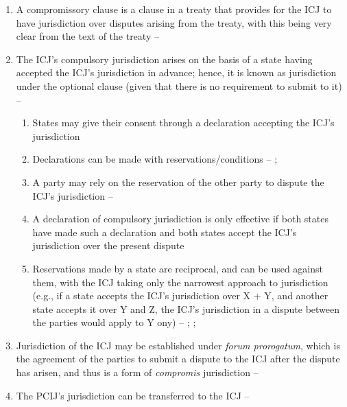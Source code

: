 \begin{enumerate}
\begin{enumerate}
\begin{enumerate}
            \item A compromissory clause is a clause in a treaty that provides for the ICJ to have jurisdiction over disputes arising from the treaty, with this being very clear from the text of the treaty -- 
            \item The ICJ's compulsory jurisdiction arises on the basis of a state having accepted the ICJ's jurisdiction in advance; hence, it is known as jurisdiction under the optional clause (given that there is no requirement to submit to it) -- 
            \begin{enumerate}
                \item States may give their consent through a declaration accepting the ICJ's jurisdiction
                \item Declarations can be made with reservations/conditions -- ; 
                \item A party may rely on the reservation of the other party to dispute the ICJ's jurisdiction -- 
                \item A declaration of compulsory jurisdiction is only effective if both states have made such a declaration and both states accept the ICJ's jurisdiction over the present dispute
                \item Reservations made by a state are reciprocal, and can be used against them, with the ICJ taking only the narrowest approach to jurisdiction (e.g., if a state accepts the ICJ's jurisdiction over X + Y, and another state accepts it over Y and Z, the ICJ's jurisdiction in a dispute between the parties would apply to Y ony) -- ; ; 
            \end{enumerate}
            \item Jurisdiction of the ICJ may be established under \textit{forum prorogatum}, which is the agreement of the parties to submit a dispute to the ICJ after the dispute has arisen, and thus is a form of \textit{compromis} jurisdiction -- 
            \item The PCIJ's jurisdiction can be transferred to the ICJ -- 

\end{enumerate}
\end{enumerate}
\end{enumerate}
